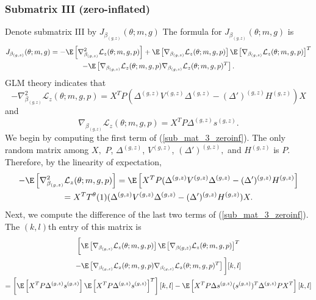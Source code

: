 \documentclass[11pt]{article}
\begin{document}
\begin{appendices}
\begin{refsection}
\subsubsection*{Submatrix III (zero-inflated)}
Denote submatrix III by $J_{\beta_{(g,z)}}(\theta; m, g)$ The formula for $J_{\beta_{(g,z)}}(\theta; m, g)$ is
\begin{multline}\label{sub_mat_3_zeroinf}
J_{\beta_{(g,z)}}(\theta; m, g) = -\E \left[\nabla_{\beta_{(g,z)}}^2 \mathcal{L}_z(\theta; m, g, p) \right] + \E\left[ \nabla_{\beta_{(g,z)}} \mathcal{L}_z(\theta; m, g, p) \right] \E\left[\nabla_{\beta_{(g,z)}} \mathcal{L}_z(\theta; m, g, p) \right]^T \\ - \E\left[ \nabla_{\beta_{(g,z)}} \mathcal{L}_z(\theta; m, g, p) \nabla_{\beta_{(g,z)}} \mathcal{L}_z(\theta; m, g, p)^T \right].
\end{multline}
GLM theory indicates that
$$ -\nabla_{\beta_{(g,z)}}^2 \mathcal{L}_z(\theta; m, g, p) =  X^T P ( \Delta^{(g,z)}V^{(g,z)}\Delta^{(g,z)} - (\Delta')^{(g,z)} H^{(g,z)}) X$$ and
$$ \nabla_{\beta_{(g,z)}} \mathcal{L}_z(\theta; m, g, p) = X^T P \Delta^{(g,z)} s^{(g,z)}.$$
We begin by computing the first term of (\ref{sub_mat_3_zeroinf}). The only random matrix among $X,$ $P$, $\Delta^{(g,z)}$, $V^{(g,z)}$, $(\Delta')^{(g,z)},$ and $H^{(g,z)}$ is $P$. Therefore, by the linearity of expectation,
\begin{multline}\label{sub_mat_3_zeroinf_1}
-\E \left[\nabla_{\beta_{(g,z)}}^2 \mathcal{L}_z(\theta; m, g, p) \right]   = \E \left[ X^T P (\Delta^{(g,z)}V^{(g,z)}\Delta^{(g,z)} - (\Delta')^{(g,z)} H^{(g,z)} \right] \\ = X^T T^{\theta}(1) ( \Delta^{(g,z)}V^{(g,z)}\Delta^{(g,z)} - (\Delta')^{(g,z)} H^{(g,z)}) X.
\end{multline}
Next, we compute the difference of the last two terms of (\ref{sub_mat_3_zeroinf}). The $(k,l)$th entry of this matrix is
\begin{multline*}
\bigg[ \E \left[\nabla_{\beta_{(g,z)}} \mathcal{L}_z(\theta; m, g, p) \right] \E \left[\nabla_{\beta{(g,z)}} \mathcal{L}_z(\theta; m, g, p)\right]^T \\ - \E \left[ \nabla_{{\beta_{(g,z)}}} \mathcal{L}_z(\theta; m, g, p) \nabla_{{\beta_{(g,z)}}} \mathcal{L}_z(\theta; m, g, p)^T \right] \bigg] [k,l] \\ 
= \left[ \E \left[ {X}^T P \Delta^{(g,z)} s^{(g,z)} \right]\E \left[ {X}^T P \Delta^{(g,z)} s^{(g,z)} \right]^T\right][k,l] - \E \left[ {X}^T P \Delta s^{(g,z)} (s^{(g,z)})^T \Delta^{(g,z)} P {X}^T \right][k,l] \\ 

\end{multline*}
\end{refsection}
\end{appendices}
\end{document}

